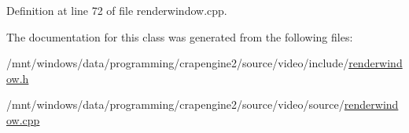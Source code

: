Definition at line 72 of file renderwindow.\+cpp.



The documentation for this class was generated from the following files\+:\begin{DoxyCompactItemize}
\item 
/mnt/windows/data/programming/crapengine2/source/video/include/\hyperlink{renderwindow_8h}{renderwindow.\+h}\item 
/mnt/windows/data/programming/crapengine2/source/video/source/\hyperlink{renderwindow_8cpp}{renderwindow.\+cpp}\end{DoxyCompactItemize}

